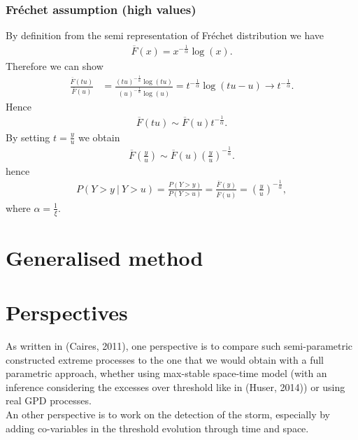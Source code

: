 \subsubsection{Fr\'echet assumption (high values)}
\label{sec:frechetassumption}
By definition from the semi representation of Fr\'echet distribution we have
\begin{align*}
\overline{F}(x) = x^{-\frac{1}{\alpha}}\log{(x)}.
\end{align*}
Therefore we can show
\begin{align*}
\frac{\overline{F}(tu)}{\overline{F}(u)} &= \frac{ (tu)^{-\frac{1}{\alpha}}\log{(tu)} } {(u)^{-\frac{1}{\alpha}}\log{(u)} } = t^{-\frac{1}{\alpha}} \log{(tu - u)} \longrightarrow t^{-\frac{1}{\alpha}}.
\end{align*}
Hence
\begin{align*}
\overline{F}(tu) \sim \overline{F}(u) t^{-\frac{1}{\alpha}}.
\end{align*}
By setting $t=\frac{y}{u}$ we obtain
\begin{align*}
\overline{F}\left(\frac{y}{u}\right) \sim \overline{F}(u) \left(\frac{y}{u}\right)^{-\frac{1}{\alpha}}.
\end{align*} 
hence
\begin{align*}
P(Y > y \: | \: Y > u) = \frac{P(Y > y)}{P(Y > u)} = \frac{\overline{F}(y)}{\overline{F}(u)} = \left( \frac{y}{u} \right) ^{-\frac{1}{\alpha}},
\end{align*}
where $\alpha = \frac{1}{\xi}$.


\section{Generalised method}



\section{Perspectives}
As written in (Caires, 2011), one perspective is to compare such semi-parametric constructed extreme processes to the one that we would obtain with a full parametric approach, whether using max-stable space-time model (with an inference considering the excesses over threshold like in (Huser, 2014)) or using real GPD processes.\\
An other perspective is to work on the detection of the storm, especially by adding co-variables in the threshold evolution through time and space. 


